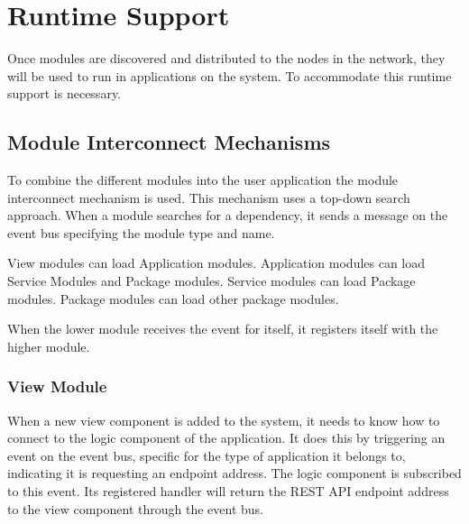 \section{Runtime Support}

Once modules are discovered and distributed to the nodes in the network, they will be used to run in applications on the system. To accommodate this runtime support is necessary.


\subsection{Module Interconnect Mechanisms}

To combine the different modules into the user application the module interconnect mechanism is used. This mechanism uses a top-down search approach. When a module searches for a dependency, it sends a message on the event bus specifying the module type and name.

View modules can load Application modules. Application modules can load Service Modules and Package modules. Service modules can load Package modules. Package modules can load other package modules.

When the lower module receives the event for itself, it registers itself with the higher module.


\subsubsection{\textbf{View Module}}
When a new view component is added to the system, it needs to know how to connect to the logic component of the application. It does this by triggering an event on the event bus, specific for the type of application it belongs to, indicating it is requesting an endpoint address. The logic component is subscribed to this event. Its registered handler will return the REST API endpoint address to the view component through the event bus.

